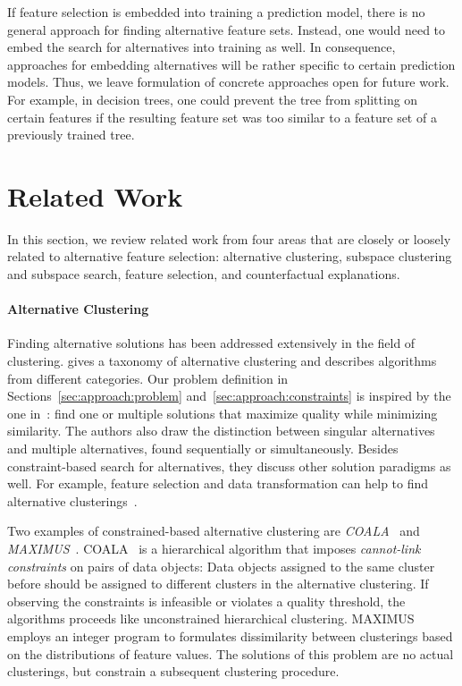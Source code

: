 \documentclass{article}
\theoremstyle{definition}
\begin{document}
If feature selection is embedded into training a prediction model, there is no general approach for finding alternative feature sets.
Instead, one would need to embed the search for alternatives into training as well.
In consequence, approaches for embedding alternatives will be rather specific to certain prediction models.
Thus, we leave formulation of concrete approaches open for future work.
For example, in decision trees, one could prevent the tree from splitting on certain features if the resulting feature set was too similar to a feature set of a previously trained tree.

\section{Related Work}
\label{sec:related-work}

In this section, we review related work from four areas that are closely or loosely related to alternative feature selection:
alternative clustering, subspace clustering and subspace search, feature selection, and counterfactual explanations.

\paragraph{Alternative Clustering}

Finding alternative solutions has been addressed extensively in the field of clustering.
\cite{bailey2014alternative} gives a taxonomy of alternative clustering and describes algorithms from different categories.
Our problem definition in Sections~\ref{sec:approach:problem} and~\ref{sec:approach:constraints} is inspired by the one in~\cite{bailey2014alternative}:
find one or multiple solutions that maximize quality while minimizing similarity.
The authors also draw the distinction between singular alternatives and multiple alternatives, found sequentially or simultaneously.
Besides constraint-based search for alternatives, they discuss other solution paradigms as well.
For example, feature selection and data transformation can help to find alternative clusterings~\cite{tao2012novel}.

Two examples of constrained-based alternative clustering are \emph{COALA}~\cite{bae2006coala} and \emph{MAXIMUS}~\cite{bae2010clustering}.
COALA~\cite{bae2006coala} is a hierarchical algorithm that imposes \emph{cannot-link constraints} on pairs of data objects:
Data objects assigned to the same cluster before should be assigned to different clusters in the alternative clustering.
If observing the constraints is infeasible or violates a quality threshold, the algorithms proceeds like unconstrained hierarchical clustering.
MAXIMUS~\cite{bae2010clustering} employs an integer program to formulates dissimilarity between clusterings based on the distributions of feature values.
The solutions of this problem are no actual clusterings, but constrain a subsequent clustering procedure.
\end{document}
